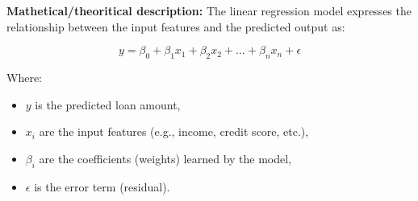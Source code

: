 \documentclass[11pt]{article}
\begin{document}
\vspace{0.5cm}
\noindent
\textbf{\large Mathetical/theoritical description: } The linear regression model expresses the relationship between the input features and the predicted output as:

\[
y = \beta_0 + \beta_1 x_1 + \beta_2 x_2 + \dots + \beta_n x_n + \epsilon
\]

Where:
\begin{itemize}
    \item $y$ is the predicted loan amount,
    \item $x_i$ are the input features (e.g., income, credit score, etc.),
    \item $\beta_i$ are the coefficients (weights) learned by the model,
    \item $\epsilon$ is the error term (residual).
\end{itemize}
 
\end{document}
